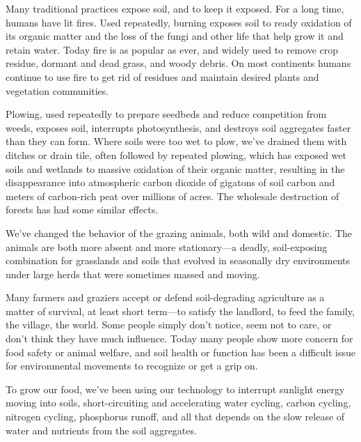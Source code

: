 \documentclass[11pt,letterpaper,twoside,onecolumn]{memoir}
\begin{document}
Many traditional practices expose soil, and to keep it exposed. For a long time, humans have lit fires. Used repeatedly, burning exposes soil to ready oxidation of its organic matter and the loss of the fungi and other life that help grow it and retain water. Today fire is as popular as ever, and widely used to remove crop residue, dormant and dead grass, and woody debris. On most continents humans continue to use fire to get rid of residues and maintain desired plants and vegetation communities.

Plowing, used repeatedly to prepare seedbeds and reduce competition from weeds, exposes soil, interrupts photosynthesis, and destroys soil aggregates faster than they can form. Where soils were too wet to plow, we've drained them with ditches or drain tile, often followed by repeated plowing, which has exposed wet soils and wetlands to massive oxidation of their organic matter, resulting in the disappearance into atmospheric carbon dioxide of gigatons of soil carbon and meters of carbon-rich peat over millions of acres. The wholesale destruction of forests has had some similar effects.

We've changed the behavior of the grazing animals, both wild and domestic. The animals are both more absent and more stationary---a deadly, soil-exposing combination for grasslands and soils that evolved in seasonally dry environments under large herds that were sometimes massed and moving.

Many farmers and graziers accept or defend soil-degrading agriculture as a matter of survival, at least short term---to satisfy the landlord, to feed the family, the village, the world. Some people simply don't notice, seem not to care, or don't think they have much influence. Today many people show more concern for food safety or animal welfare, and soil health or function has been a difficult issue for environmental movements to recognize or get a grip on.

To grow our food, we've been using our technology to interrupt sunlight energy moving into soils, short-circuiting and accelerating water cycling, carbon cycling, nitrogen cycling, phosphorus runoff, and all that depends on the slow release of water and nutrients from the soil aggregates. 
\end{document}

